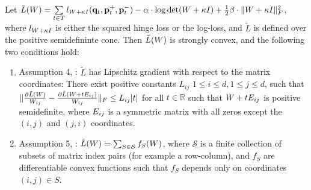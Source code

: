 \documentclass{article}
\begin{document}
\begin{theorem}
Let $\tilde{L}({W})=\sum\limits_{t\in T}{l_{{W} + \kappa I}(\mathbf{q}_t, \mathbf{p}_{t}^{+}, \mathbf{p}_{t}^{-})} - \alpha \cdot \log \det({W} + \kappa I) + \tfrac{1}{2} \beta \cdot \| {W} + \kappa I \|_{F}^{2}$, where $l_{{W} + \kappa I}$ is either the squared hinge loss or the log-loss, and $\tilde{L}$ is defined over the positive semidefininte cone.
Then $\tilde{L}({W})$ is strongly convex, and the following two conditions hold:
\begin{enumerate}
\item Assumption 4, \citet{richtarik2013optimal}: $\tilde{L}$ has Lipschitz gradient with respect to the matrix coordinates: There exist positive constants $L_{ij}$ $1 \leq i \leq d, 1 \leq j \leq d$, such that $\| \frac{\partial \tilde{L}({W})}{W_{ij}} - \frac{\partial \tilde{L}({W} + t {E}_{ij})}{W_{ij}} \|_F \leq L_{ij} |t|$ for all $t \in \mathbb{R}$ such that ${W} + t{E}_{ij}$ is positive semidefinite, where ${E}_{ij}$ is a symmetric matrix with all zeros except the $(i,j)$ and $(j,i)$ coordinates.

\item Assumption 5, \citet{richtarik2013optimal}: 
$\tilde{L}({W}) = \sum_{S \in \mathcal{S}} f_S ({W})$, where $\mathcal{S}$ is a finite collection of subsets of matrix index pairs (for example a row-column), and $f_S$ are differentiable convex functions such that $f_S$ depends only on coordinates $(i,j) \in S$.
\end{enumerate}
\end{theorem}
\end{document}

